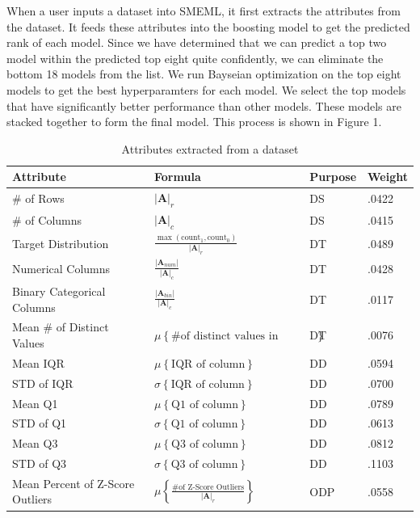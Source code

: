 \documentclass{article}
\begin{document}
When a user inputs a dataset into SMEML, it first extracts the attributes from the dataset. It feeds these attributes into the boosting model to get the predicted rank of each model. Since we have determined that we can predict a top two model within the predicted top eight quite confidently, we can eliminate the bottom 18 models from the list. We run Bayseian optimization on the top eight models to get the best hyperparamters for each model. We select the top models that have significantly better performance than other models. These models are stacked together to form the final model. This process is shown in Figure 1.
\begin{table}
  \caption{Attributes extracted from a dataset}
  \label{model-options-table}
  \centering
  \begin{tabular}{llll}
    \toprule
    Attribute & Formula & Purpose & Weight\\
    \midrule
    \# of Rows & $|\mathbf{A}|_r$ & DS & .0422 \\
    \hline
    \# of Columns & $|\mathbf{A}|_c$ & DS & .0415 \\
    \hline
    Target Distribution &
    $\frac{\max(\text{count}_1, \text{count}_0)}{|\mathbf{A}|_r}$
    & DT & .0489 \\
    \hline
    Numerical Columns &
    $\frac{|\mathbf{A}_{num}|}{|\mathbf{A}|_{c}}$
    & DT & .0428 \\
    \hline
    Binary Categorical Columns &
    $\frac{|\mathbf{A}_{bin}|}{|\mathbf{A}|_{c}}$
    & DT & .0117 \\
    \hline
    Mean \# of Distinct Values  & $\mu \left\{\text{\# of distinct values in column}\right\}$ & DT & .0076 \\ 
    \hline
    Mean IQR  & $\mu \left\{\text{IQR of column}\right\}$ & DD & .0594 \\ 
    \hline
    STD of IQR  & $\sigma \left\{\text{IQR of column}\right\}$ & DD & .0700 \\
    \hline
    Mean Q1 & $\mu \left\{\text{Q1 of column}\right\}$ & DD & .0789 \\
    \hline
    STD of Q1  & $\sigma \left\{\text{Q1 of column}\right\}$ & DD & .0613 \\
    \hline
    Mean Q3  & $\mu \left\{\text{Q3 of column}\right\}$ & DD & .0812 \\
    \hline
    STD of Q3  & $\sigma \left\{\text{Q3 of column}\right\}$ & DD & .1103 \\
    \hline
    Mean Percent of Z-Score Outliers  & 
    $\mu \left\{ \frac{\text{\# of Z-Score Outliers}}{|\mathbf{A}|_r} \right\}$ & ODP & .0558 \\

\end{tabular}
\end{table}
\end{document}
